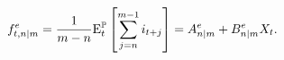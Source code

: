\begin{equation*}
	f_{t,n | m}^{e} = \frac{1}{m - n} \mathrm{E}^{\mathbb{P}}_{t} \left[ \sum_{j = n} ^{m-1} i_{t+j} \right] = A_{n | m}^{e} + B_{n | m}^{e} X_{t}.
\end{equation*}